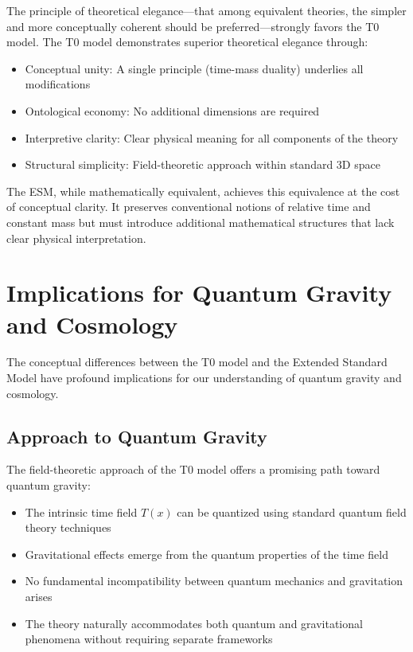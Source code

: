 \documentclass[12pt,a4paper]{article}
\newcommand{\Tfield}{T(x)}
\begin{document}
	The principle of theoretical elegance—that among equivalent theories, the simpler and more conceptually coherent should be preferred—strongly favors the T0 model. The T0 model demonstrates superior theoretical elegance through:
	
	\begin{itemize}
		\item Conceptual unity: A single principle (time-mass duality) underlies all modifications
		\item Ontological economy: No additional dimensions are required
		\item Interpretive clarity: Clear physical meaning for all components of the theory
		\item Structural simplicity: Field-theoretic approach within standard 3D space
	\end{itemize}
	
	The ESM, while mathematically equivalent, achieves this equivalence at the cost of conceptual clarity. It preserves conventional notions of relative time and constant mass but must introduce additional mathematical structures that lack clear physical interpretation.
	
	\section{Implications for Quantum Gravity and Cosmology}
	\label{sec:implications}
	
	The conceptual differences between the T0 model and the Extended Standard Model have profound implications for our understanding of quantum gravity and cosmology.
	
	\subsection{Approach to Quantum Gravity}
	\label{subsec:quantum_gravity}
	
	The field-theoretic approach of the T0 model offers a promising path toward quantum gravity:
	
	\begin{itemize}
		\item The intrinsic time field \(\Tfield\) can be quantized using standard quantum field theory techniques
		\item Gravitational effects emerge from the quantum properties of the time field
		\item No fundamental incompatibility between quantum mechanics and gravitation arises
		\item The theory naturally accommodates both quantum and gravitational phenomena without requiring separate frameworks
	\end{itemize}
	
\end{document}
